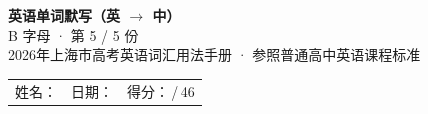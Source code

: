 \documentclass[10pt,a4paper]{article}
\begin{document}
\pagestyle{plain}

\begin{center}
{\LARGE\bfseries 英语单词默写（英 $\to$ 中）}\\[0.22em]
{\large B 字母 · 第 5 / 5 份}\\[0.18em]
{\small 2026年上海市高考英语词汇用法手册 · 参照普通高中英语课程标准}
\end{center}

\vspace{0.25em}
\noindent\begin{tabular}{@{}p{}@{}p{}@{}p{}@{}}
姓名：\underline{\hspace{2.0cm}} & 日期：\underline{\hspace{2.0cm}} & 得分：\underline{\hspace{1.3cm}}\,/\,46 \\
\end{tabular}

\vspace{0.3em}

\vspace{0.08em}
\end{document}
